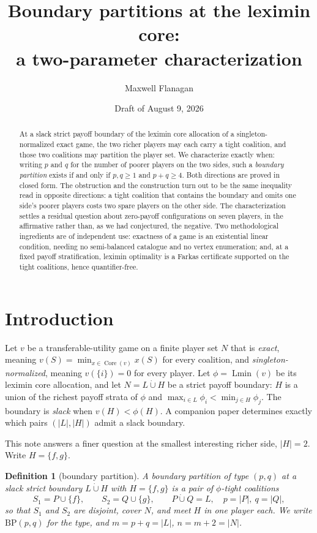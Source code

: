 \documentclass[11pt]{article}
\title{Boundary partitions at the leximin core:\\
a two-parameter characterization}
\author{Maxwell Flanagan}
\date{Draft of August 9, 2026}
\newtheorem{definition}[theorem]{Definition}
\newcommand{\core}{\operatorname{Core}}
\newcommand{\Lmin}{\operatorname{Lmin}}
\newcommand{\PART}{\mathrm{BP}}
\begin{document}
\maketitle

\begin{abstract}
At a slack strict payoff boundary of the leximin core allocation of a
singleton-normalized exact game, the two richer players may each carry a tight
coalition, and those two coalitions may partition the player set.  We
characterize exactly when: writing $p$ and $q$ for the number of poorer players
on the two sides, such a \emph{boundary partition} exists if and only if
$p,q\ge1$ and $p+q\ge4$.  Both directions are proved in closed form.  The
obstruction and the construction turn out to be the same inequality read in
opposite directions: a tight coalition that contains the boundary and omits one
side's poorer players costs two spare players on the other side.  The
characterization settles a residual question about zero-payoff configurations
on seven players, in the affirmative rather than, as we had conjectured, the
negative.  Two methodological ingredients are of independent use: exactness of
a game is an existential linear condition, needing no semi-balanced catalogue
and no vertex enumeration; and, at a fixed payoff stratification, leximin
optimality is a Farkas certificate supported on the tight coalitions, hence
quantifier-free.
\end{abstract}

\section{Introduction}

Let $v$ be a transferable-utility game on a finite player set $N$ that is
\emph{exact}, meaning $v(S)=\min_{x\in\core(v)}x(S)$ for every coalition, and
\emph{singleton-normalized}, meaning $v(\{i\})=0$ for every player.  Let
$\phi=\Lmin(v)$ be its leximin core allocation, and let $N=L\mathbin{\dot\cup}H$
be a strict payoff boundary: $H$ is a union of the richest payoff strata of
$\phi$ and $\max_{i\in L}\phi_i<\min_{j\in H}\phi_j$.  The boundary is
\emph{slack} when $v(H)<\phi(H)$.  A companion paper \citep{Flanagan2026phase}
determines exactly which pairs $(|L|,|H|)$ admit a slack boundary.

This note answers a finer question at the smallest interesting richer side,
$|H|=2$.  Write $H=\{f,g\}$.

\begin{definition}[boundary partition]\label{def:bp}
A \emph{boundary partition of type $(p,q)$} at a slack strict boundary
$L\mathbin{\dot\cup}H$ with $H=\{f,g\}$ is a pair of $\phi$-tight coalitions
\[
 S_1=P\cup\{f\},\qquad S_2=Q\cup\{g\},\qquad
 P\mathbin{\dot\cup}Q=L,\quad p=|P|,\ q=|Q|,
\]
so that $S_1$ and $S_2$ are disjoint, cover $N$, and meet $H$ in one player
each.  We write $\PART(p,q)$ for the type, and $m=p+q=|L|$, $n=m+2=|N|$.
\end{definition}
\end{document}
